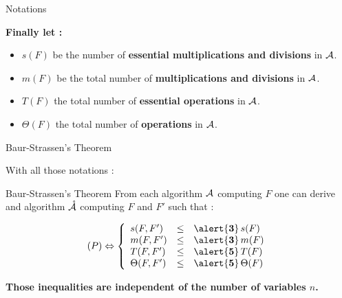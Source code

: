\begin{frame}{Notations}

    \textbf{Finally let :}

\begin{itemize}
    \item \alert{$s(F)$} be the number of \textbf{essential multiplications and divisions} in $\mathcal{A}$.
        \vskip 0.5cm
    \item \alert{$m(F)$} be the total number of \textbf{multiplications and divisions} in $\mathcal{A}$.
        \vskip 0.5cm
    \item \alert{$T(F)$} the total number of \textbf{essential operations} in $\mathcal{A}$.
        \vskip 0.5cm
    \item \alert{$\Theta(F)$} the total number of \textbf{operations} in $\mathcal{A}$.
\end{itemize}

\end{frame}


\begin{frame}{Baur-Strassen's Theorem}

With all those notations :

\begin{block}{Baur-Strassen's Theorem}
From each algorithm $\mathcal{A}$ computing $F$ one can derive and algorithm $\mathring{\mathcal{A}}$ computing $F$ and $F'$ such that :

   $$
   (P) \Leftrightarrow
   \left\{
   \begin{array}{l c l}
       s(F,F') &\leq & \alert{\mathbf{3}} \,s(F)\\
       m(F,F') &\leq & \alert{\mathbf{3}} \,m(F)\\
       T(F,F') &\leq & \alert{\mathbf{5}} \,T(F)\\
       \Theta(F,F') &\leq & \alert{\mathbf{5}} \,\Theta(F)
   \end{array}
   \right.
   $$

   \vskip 0.3cm
   \textbf{Those inequalities are \alert{independent} of the number of variables $n$.}

\end{block}

\end{frame}


